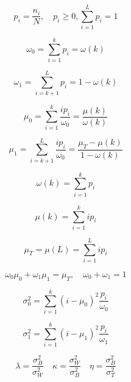 \documentclass{article}
\begin{document}
\begin{equation}
  \label{eq:1}
  p_i=\frac{n_i}{N},\quad p_i\geqslant 0,\sum_{i=1}^Lp_i=1
\end{equation}

\begin{equation}
  \label{eq:2}
  \omega_0=\sum_{i=1}^kp_i=\omega(k)
\end{equation}

\begin{equation}
  \label{eq:3}
  \omega_1=\sum_{i=k+1}^Lp_i=1-\omega(k)
\end{equation}

\begin{equation}
  \label{eq:4}
  \mu_0=\sum_{i=1}^k\frac{ip_i}{\omega_0}=\frac{\mu(k)}{\omega(k)}
\end{equation}

\begin{equation}
  \label{eq:5}
  \mu_1=\sum_{i=k+1}^L\frac{ip_i}{\omega_0}=\frac{\mu_T-\mu(k)}{1-\omega(k)}
\end{equation}

\begin{equation}
  \label{eq:6}
  \omega(k)=\sum_{i=1}^kp_i
\end{equation}

\begin{equation}
  \label{eq:7}
  \mu(k)=\sum_{i=1}^kip_i
\end{equation}

\begin{equation}
  \label{eq:8}
  \mu_T=\mu(L)=\sum_{i=1}^Lip_i
\end{equation}

\begin{equation}
  \label{eq:9}
  \omega_0\mu_0+\omega_1\mu_1=\mu_T,\quad\omega_0+\omega_1=1
\end{equation}

\begin{equation}
  \label{eq:10}
  \sigma_0^2=\sum_{i=1}^k(i-\mu_0)^2\frac{p_i}{\omega_0}
\end{equation}

\begin{equation}
  \label{eq:11}
  \sigma_1^2=\sum_{i=1}^k(i-\mu_1)^2\frac{p_i}{\omega_1}
\end{equation}

\begin{equation}
  \label{eq:12}
  \lambda=\frac{\sigma_B^2}{\sigma_W^2}\quad
  \kappa=\frac{\sigma_W^2}{\sigma_B^2}\quad
  \eta=\frac{\sigma_B^2}{\sigma_T^2}
\end{equation}
\end{document}
